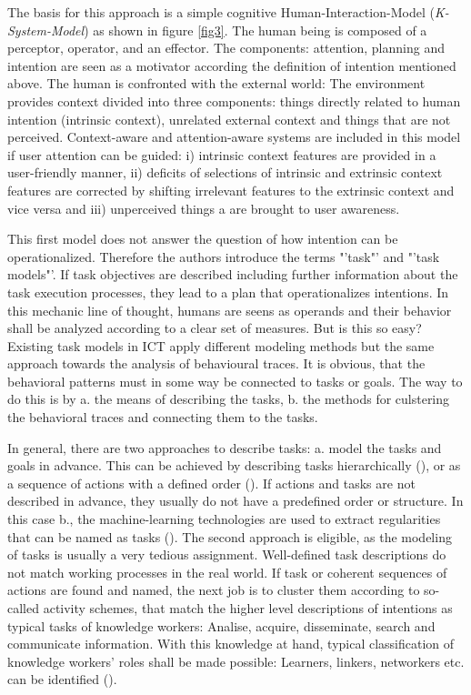 The basis for this approach is a simple cognitive Human-Interaction-Model (\textit{K-System-Model}) as shown in figure \ref{fig3}. The human being is composed of a perceptor, operator, and an effector. The components: attention, planning and intention are seen as a motivator according the definition of intention mentioned above. The human is confronted with the external world: The environment provides context divided into three components: things directly related to human intention (intrinsic context), unrelated external context and things that are not perceived. Context-aware and attention-aware systems are included in this model if user attention can be guided: i) intrinsic context features are provided in a user-friendly manner, ii) deficits of selections of intrinsic and extrinsic context features are corrected by shifting irrelevant features to the extrinsic context and vice versa and iii) unperceived things a are brought to user awareness. 

This first model does not answer the question of how intention can be operationalized. Therefore the authors introduce the terms "'task"' and "'task models"'. If task objectives are described including further information about the task execution processes, they lead to a plan that operationalizes intentions.  In this mechanic line of thought, humans are seens as operands and their behavior shall be analyzed according to a clear set of measures. But is this so easy? Existing task models in \ac{ICT} apply different modeling methods but the same approach towards the analysis of behavioural traces. It is obvious, that the behavioral patterns must in some way be connected to tasks or goals. The way to do this is by a. the means of describing the tasks, b. the methods for culstering the behavioral traces and connecting them to the tasks. 

In general, there are two approaches to describe tasks: a. model the tasks and goals in advance. This can be achieved by describing tasks hierarchically (\cite{newell1972human}), or as a sequence of actions with a defined order  (\cite{eder1995workflow}). If actions and tasks are not described in advance, they usually do not have a predefined order or structure. In this case b., the machine-learning technologies are used to extract regularities that can be named as tasks (\cite{schmitz2011contextualized}). The second approach is eligible, as the modeling of tasks is usually a very tedious assignment. Well-defined task descriptions do not match working processes in the real world. If task or coherent sequences of actions are found and named, the next job is to cluster them according to so-called activity schemes, that match the higher level descriptions of intentions as typical tasks of knowledge workers: Analise, acquire, disseminate, search and communicate information. With this knowledge at hand, typical classification of knowledge workers' roles shall be made possible: Learners, linkers, networkers etc. can be identified (\cite{reinhardt2011knowledge}). 


